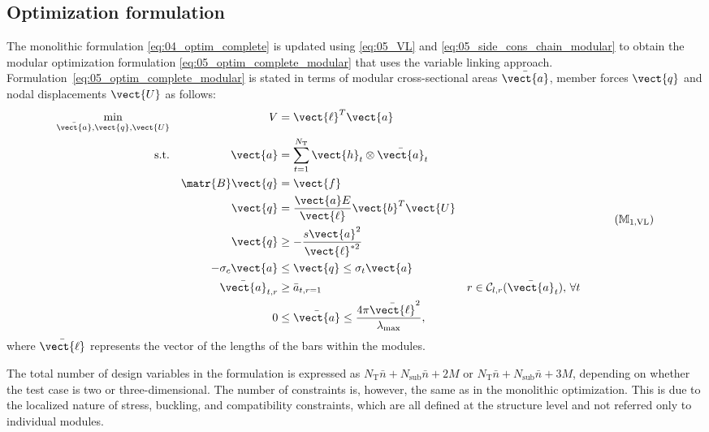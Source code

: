 \subsection{Optimization formulation} \label{sec:05_opt_formulation}
The monolithic formulation \ref{eq:04_optim_complete} is updated using \eqref{eq:05_VL} and \eqref{eq:05_side_cons_chain_modular} to obtain the modular optimization formulation \ref{eq:05_optim_complete_modular} that uses the variable linking approach. Formulation~\ref{eq:05_optim_complete_modular} is stated in terms of modular cross-sectional areas $\bar{\vect{a}}$, member forces $\vect{q}$ and nodal displacements $\vect{U}$ as follows:
\begin{equation}
    \begin{aligned}
    \min_{\bar{\vect{a}}, \vect{q}, \vect{U}}   && V &= \vect{\ell}^{T}\vect{a}\\
    \textrm{s.t.}  && \vect{a} &= \sum_{t=1}^{N_\text{T}} \vect{h}_t\otimes\bar{\vect{a}}_t \\ 
    && \matr{B}\vect{q} &= \vect{f} && \\
    && \vect{q} &= \frac{\vect{a}E}{\vect{\ell}}\vect{b}^T\vect{U} &&  \\
    && \vect{q} &\geq -\frac{s\vect{a}^2}{\vect{\ell}^{*2}} &&  \\
    && -\sigma_c\vect{a} &\leq \vect{q} \leq \sigma_t\vect{a} &&  \\
    && \bar{\vect{a}}_{t,r}&\geq \bar{a}_{t,r=1} && r \in \mathcal{C}_{l,r}(\bar{\vect{a}}_t),\, \forall t \\
    && 0 &\leq \bar{\vect{a}} \leq \frac{4 \pi \bar{\vect{\ell}}^2}{\lambda_{\text{max}}}, \\
    \end{aligned}
    \tag{${\mathbb{M}}_\text{1,VL}$}
    \label{eq:05_optim_complete_modular}
\end{equation}
where $\bar{\vect{\ell}}$ represents the vector of the lengths of the bars within the modules.

The total number of design variables in the formulation is expressed as $N_\text{T}\bar{n} + N_{\text{sub}}\bar{n} + 2M$ or $N_\text{T}\bar{n} + N_{\text{sub}}\bar{n} + 3M$, depending on whether the test case is two or three-dimensional. The number of constraints is, however, the same as in the monolithic optimization. This is due to the localized nature of stress, buckling, and compatibility constraints, which are all defined at the structure level and not referred only to individual modules.

